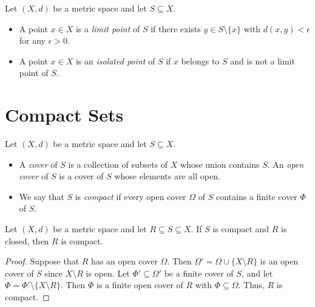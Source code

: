 \begin{definition}
  Let $(X, d)$ be a metric space and let $S \subseteq X$.
  \begin{itemize}
    \item A point $x \in X$ is a \emph{limit point} of $S$ if there exists
    $y \in S \setminus \{x\}$ with $d(x, y) < \epsilon$ for any $\epsilon > 0$.
    \item A point $x \in X$ is an \emph{isolated point} of $S$ if $x$ belongs
    to $S$ and is not a limit point of $S$.
  \end{itemize}
\end{definition}

\section{Compact Sets}
\begin{definition}
  Let $(X, d)$ be a metric space and let $S \subseteq X$.
  \begin{itemize}
    \item A \emph{cover} of $S$ is a collection of subsets of $X$ whose union
    contains $S$.
    An \emph{open cover} of $S$ is a cover of $S$ whose elements are all open.
    \item We say that $S$ is \emph{compact} if every open cover $\Omega$ of $S$
    contains a finite cover $\Phi$ of $S$.
  \end{itemize}
\end{definition}

\begin{theorem}
  Let $(X, d)$ be a metric space and let $R \subseteq S \subseteq X$.
  If $S$ is compact and $R$ is closed, then $R$ is compact.
\end{theorem}
\begin{proof}
  Suppose that $R$ has an open cover $\Omega$.
  Then $\Omega' = \Omega \cup \{X \setminus R\}$ is an open cover of $S$ since
  $X \setminus R$ is open.
  Let $\Phi' \subseteq \Omega'$ be a finite cover of $S$, and let
  $\Phi = \Phi' \setminus \{X \setminus R\}$.
  Then $\Phi$ is a finite open cover of $R$ with $\Phi \subseteq \Omega$.
  Thus, $R$ is compact.
\end{proof}

